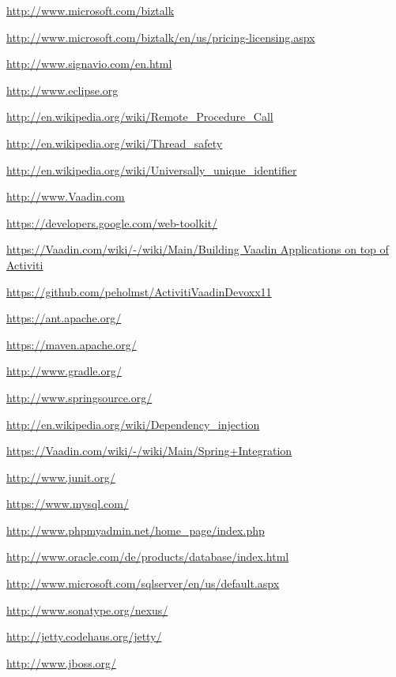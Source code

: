 \documentclass[paper=a4,twoside=false,BCOR=0mm,DIV=calc,fontsize=12pt]{scrartcl}
\begin{document}
\begin{thebibliography}{99}
 \url{http://www.microsoft.com/biztalk}

 \url{http://www.microsoft.com/biztalk/en/us/pricing-licensing.aspx}

 \url{http://www.signavio.com/en.html}

 \url{http://www.eclipse.org} %

 \url{http://en.wikipedia.org/wiki/Remote_Procedure_Call}

 \url{http://en.wikipedia.org/wiki/Thread_safety}

 \url{http://en.wikipedia.org/wiki/Universally_unique_identifier}

 \url{http://www.Vaadin.com}

 \url{https://developers.google.com/web-toolkit/}

 \url{https://Vaadin.com/wiki/-/wiki/Main/Building Vaadin Applications on top of Activiti}

 \url{https://github.com/peholmst/ActivitiVaadinDevoxx11}

 \url{https://ant.apache.org/}

 \url{https://maven.apache.org/}

 \url{http://www.gradle.org/}

 \url{http://www.springsource.org/}

 \url{http://en.wikipedia.org/wiki/Dependency_injection}

 \url{https://Vaadin.com/wiki/-/wiki/Main/Spring+Integration}

 \url{http://www.junit.org/}

 \url{https://www.mysql.com/}

 \url{http://www.phpmyadmin.net/home_page/index.php}

 \url{http://www.oracle.com/de/products/database/index.html}

 \url{http://www.microsoft.com/sqlserver/en/us/default.aspx}

 \url{http://www.sonatype.org/nexus/}

 \url{http://jetty.codehaus.org/jetty/}

 \url{http://www.jboss.org/}


\end{thebibliography}
\end{document}
